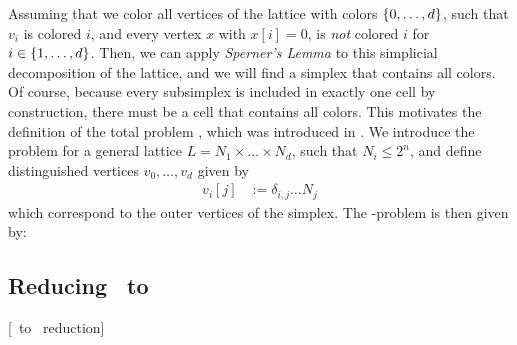 Assuming that we color all vertices of the lattice with colors $\left\{0, \dots, d\right\}$, such that $v_i$ is colored $i$, and every vertex $x$ with $x[i] = 0$, is \textit{not} colored $i$ for $i \in \left\{1, \dots, d\right\}$. Then, we can apply \textit{Sperner's Lemma} to this simplicial decomposition of the lattice, and we will find a simplex that contains all colors. Of course, because every subsimplex is included in exactly one cell by construction, there must be a cell that contains all colors. This motivates the definition of the total problem \Sperner, which was introduced in . We introduce the problem for a general lattice $L = N_1 \times \dots \times N_d$, such that $N_i \leq 2^n$, and define distinguished vertices $v_0, \dots, v_d$ given by
\begin{align*}
    v_i[j] &:= \delta_{i, j} \dots N_j
\end{align*}
which correspond to the outer vertices of the simplex. The \Sperner-problem is then given by:


\subsection{Reducing \Sperner\ to \EndOfLine}[\Sperner\ to \EndOfLine\ reduction]
\label{sec:sperner_eol_reduction}

